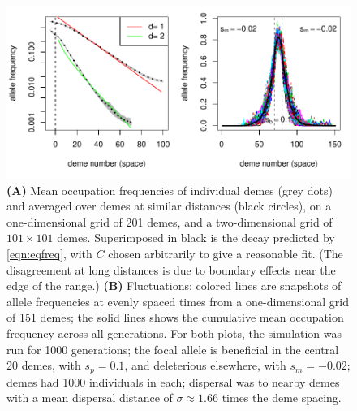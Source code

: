 \documentclass{article}
\begin{document}
\begin{figure}[ht!]
  \begin{center}
    \includegraphics{sim-occupation-freqs}
  \end{center}
  \caption{
  \textbf{(A)} 
  Mean occupation frequencies of individual demes (grey dots)
  and averaged over demes at similar distances (black circles), on
  a one-dimensional grid of 201 demes, and
  a two-dimensional grid of $101\times 101$ demes.
  Superimposed in black is the decay predicted by \eqref{eqn:eqfreq},
  with $C$ chosen arbitrarily to give a reasonable fit.
  (The disagreement at long distances is due to boundary effects near the edge of the range.)
  \textbf{(B)} 
  Fluctuations: colored lines are snapshots of allele frequencies at evenly spaced times
  from a one-dimensional grid of 151 demes;
  the solid lines shows the cumulative mean occupation frequency across all generations.
  For both plots, the simulation was run for 1000 generations;
  the focal allele is beneficial in the central 20 demes, with $s_p=0.1$,
  and deleterious elsewhere, with $s_m=-0.02$; 
  demes had 1000 individuals in each;
  dispersal was to nearby demes with a mean dispersal distance of $\sigma \approx 1.66$  times the deme spacing.
   }   \label{fig:sim_occupation_freqs}
\end{figure}
\end{document}

